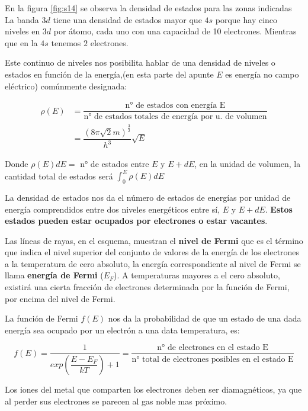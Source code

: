 En la figura \ref{fig:s14} se observa la densidad de estados para las zonas indicadas La banda $3d$ tiene una densidad de estados mayor que $4s$ porque hay cinco niveles en $3d$ por átomo, cada uno con una capacidad de 10 electrones. Mientras que en la $4s$ tenemos $2$ electrones.

Este continuo de niveles nos posibilita hablar de una densidad de niveles o estados en función de la energía,(en esta parte del apunte $E$ es energía no campo eléctrico) comúnmente designada:

\begin{equation}
\begin{aligned}
	\rho(E)&= \dfrac{\text{n° de estados con energía E}}{\text{n° de estados totales de energía por u. de volumen}} \\
	&= \dfrac{(8 \pi \sqrt{2} m )^{\frac{3}{2}}}{h^{3}}\sqrt{E}
\end{aligned}
\end{equation}

Donde $\rho(E)dE =$ n° de estados entre $E$ y $E+dE$, en la unidad de volumen, la cantidad total de estados será $\int_{0}^{E} \rho(E)dE$

La densidad de estados nos da el número de estados de energías por unidad de energía comprendidos entre dos niveles energéticos entre sí, $E$ y $E+dE$. \textbf{Estos estados pueden estar ocupados por electrones o estar vacantes}.
 
Las líneas de rayas, en el esquema, muestran el \textbf{nivel de Fermi} que es el término que indica el nivel superior del conjunto de valores de la energía de los electrones a la temperatura de cero absoluto, la energía correspondiente al nivel de Fermi se llama \textbf{energía de Fermi} ($E_{F}$). A temperaturas mayores a el cero absoluto, existirá una cierta fracción de electrones determinada por la función de Fermi, por encima del nivel de Fermi.

La función de Fermi $f(E)$ nos da la probabilidad de que un estado de una dada energía sea
ocupado por un electrón a una data temperatura, es:

\begin{equation}
	f(E)=\dfrac{1}{exp\left(\dfrac{E-E_{F}}{kT}\right)  + 1} = \dfrac{\text{n° de electrones en el estado E}}{\text{n° total de electrones posibles en el estado E}}	
\end{equation}

Los iones del metal que comparten los electrones deben ser diamagnéticos, ya que al perder sus electrones se parecen al gas noble mas próximo.

